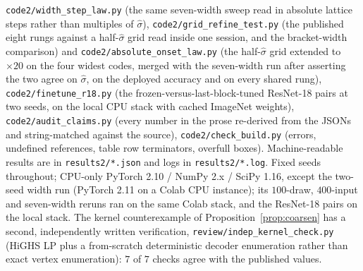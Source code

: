 \documentclass[11pt]{article}
\begin{document}
\texttt{code2/width\_step\_law.py} (the same seven-width sweep read in absolute lattice steps rather
than multiples of $\hat\sigma$), \texttt{code2/grid\_refine\_test.py} (the published eight rungs
against a half-$\hat\sigma$ grid read inside one session, and the bracket-width comparison) and
\texttt{code2/absolute\_onset\_law.py} (the half-$\hat\sigma$ grid extended to $\times20$ on the four
widest codes, merged with the seven-width run after asserting the two agree on $\hat\sigma$, on the
deployed accuracy and on every shared rung),
\texttt{code2/finetune\_r18.py} (the frozen-versus-last-block-tuned ResNet-18 pairs at two seeds, on
the local CPU stack with cached ImageNet weights),
\texttt{code2/audit\_claims.py} (every number in the prose re-derived from the JSONs and
string-matched against the source), \texttt{code2/check\_build.py} (errors, undefined
references, table row terminators, overfull boxes). Machine-readable results are in
\texttt{results2/*.json} and logs in \texttt{results2/*.log}. Fixed seeds throughout;
CPU-only PyTorch 2.10 / NumPy 2.x / SciPy 1.16, except the two-seed width run (PyTorch 2.11 on a
Colab CPU instance); its $100$-draw, $400$-input and seven-width reruns ran on the same Colab stack,
and the ResNet-18 pairs on the local stack.
The kernel counterexample of Proposition~\ref{prop:coarsen} has a second, independently written
verification, \texttt{review/indep\_kernel\_check.py} (HiGHS LP plus a from-scratch deterministic
decoder enumeration rather than exact vertex enumeration): $7$ of $7$ checks agree with the
published values.
\end{document}
